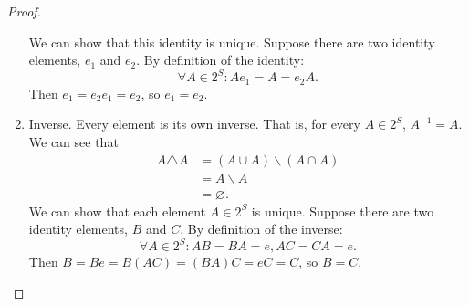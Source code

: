\documentclass{article}
\begin{document}
\begin{proof}
\begin{enumerate}[label=(\arabic*)]
    We can show that this identity is unique. Suppose there are two identity elements, $e_1$ and $e_2$. By definition of the identity:
    \[\forall A \in 2^S: Ae_1 = A = e_2A.\]
    Then $e_1=e_2e_1=e_2$, so $e_1=e_2$.
    \item Inverse. Every element is its own inverse. That is, for every $A\in 2^S$, $A^{-1}=A$. We can see that
    \begin{align*}
        A\triangle A &= (A\cup A)\backslash (A\cap A)\\
        &=A\backslash A\\
        &=\varnothing.
    \end{align*}
    We can show that each element $A \in 2^S$ is unique. Suppose there are two identity elements, $B$ and $C$. By definition of the inverse:
    \[\forall A\in 2^S: AB=BA=e, AC=CA=e.\]
    Then $B=Be=B(AC)=(BA)C=eC=C$, so $B=C$.
\end{enumerate}
\end{proof}
\end{document}
